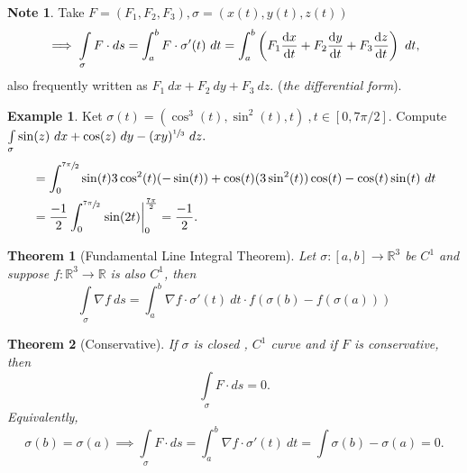 \documentclass[
	12pt,
	]{article}
\newcommand{\R}{\mathbb{R}}
\theoremstyle{custom}
\newtheorem{theorem}{Theorem}[section]
\theoremstyle{custom}
\theoremstyle{custom}
\theoremstyle{custom}
\theoremstyle{custom}
\theoremstyle{definition}
\newtheorem{example}{Example}[section]
\theoremstyle{example}
\newtheorem*{note}{Note}
\theoremstyle{note}
\theoremstyle{remark}
\theoremstyle{example}
\newcounter{theo}[section]\setcounter{theo}{0}
\numberwithin{equation}{subsection}
\begin{document}
  				\begin{note}
  					Take $F = (F_{1}, F_{2} , F_{3}), \sigma = (x(t) , y(t) , z(t))$
  					\begin{equation}
	  					\implies \int\limits_{\sigma} F\cdot ds = \int_{a}^{b} F \cdot \sigma'(t) \ dt = \int_{a}^{b} \left(F_{1} \dv{x}{t} + F_{2} \dv{y}{t} + F_{3} \dv{z}{t}\right)\ dt,
  					\end{equation}
  					also frequently written as $F_{1}\ dx + F_{2} \ dy + F_{3} \ dz.$ (\textit{the differential form}).
  				\end{note}
  				
  				\begin{example}
  					Ket $\sigma(t) = (\cos^{3}(t) , \sin^{2}(t), t)  \ , t\in [0 , 7\pi/ 2]$. Compute $\int\limits_{\sigma} \sin(z) \ dx + \cos(z) \ dy - (xy)^{\sfrac{1}{3}} \ dz.$
  					\begin{align*}
  						&= \int_{0}^{\sfrac{7\pi}{2}} \sin(t) 3\cos^{2}(t)(-\sin(t)) + \cos(t)(3\sin^{2}(t))\cos(t) - \cos(t)\sin(t) \ dt\\
  						&= \frac{-1}{2} \int_{0}^{\sfrac{7\pi}{2}} \eval{\sin(2t)}_{0}^{\frac{7\pi}{2}} = \frac{-1}{2}.
  					\end{align*}
  				\end{example}
  				
  				\begin{theorem}[Fundamental Line Integral Theorem]
  					Let $\sigma : [a,b] \to \R^{3}$ be $C^{1}$ and suppose $f: \R^{3} \to \R$ is also $C^{1}$, then 
  					\begin{equation}
  						\int\limits_{\sigma} \nabla f \ ds = \int_{a}^{b} \nabla f \cdot \sigma'(t) \ dt \cdot f(\sigma (b) - f(\sigma(a)))
  					\end{equation}
  				\end{theorem}
  				
  				\begin{theorem}[Conservative]
  					If $\sigma$ is closed , $C^{1}$ curve and if $F$ is conservative, then 
  					\begin{equation} 
  					\int\limits_{\sigma} F \cdot ds = 0.
  					\end{equation}
  					Equivalently, 
  					\begin{equation} 
  					\sigma(b) = \sigma(a) \implies \int\limits_{\sigma}F\cdot ds = \int_{a}^{b} \nabla f \cdot \sigma'(t)\ dt = \int \sigma(b) - \sigma(a) = 0.
  					\end{equation}
  				\end{theorem}
  				
\end{document}
